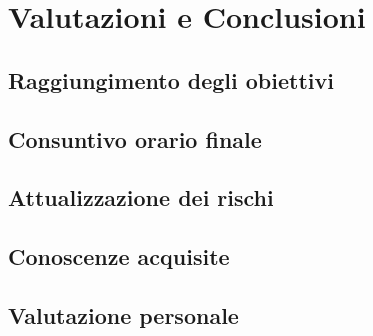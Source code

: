 \chapter{Valutazioni e Conclusioni}
\label{cap:conclusioni}
\section{Raggiungimento degli obiettivi}
\section{Consuntivo orario finale}

\section{Attualizzazione dei rischi}

\section{Conoscenze acquisite}

\section{Valutazione personale}

